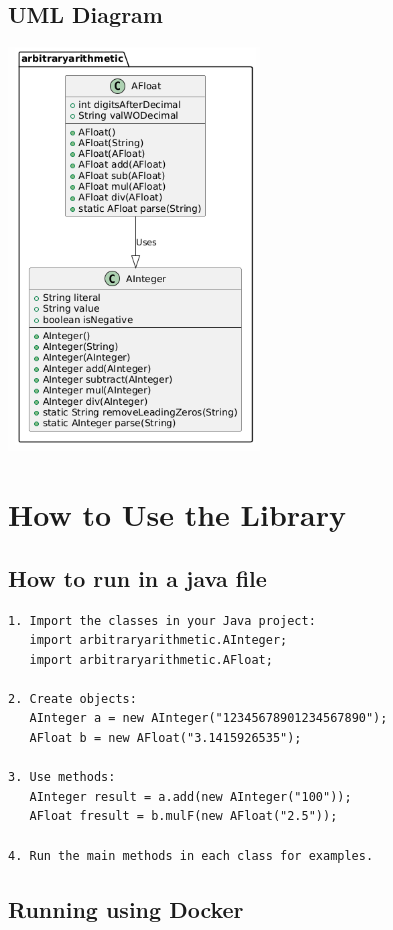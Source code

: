 \documentclass[12pt]{article}
\begin{document}
\subsection*{UML Diagram}
\begin{center}
\includegraphics[width=0.5\textwidth]{uml-diagram.png}
\end{center}

\section{How to Use the Library}
\subsection{How to run in a java file}
\begin{verbatim}
1. Import the classes in your Java project:
   import arbitraryarithmetic.AInteger;
   import arbitraryarithmetic.AFloat;

2. Create objects:
   AInteger a = new AInteger("12345678901234567890");
   AFloat b = new AFloat("3.1415926535");

3. Use methods:
   AInteger result = a.add(new AInteger("100"));
   AFloat fresult = b.mulF(new AFloat("2.5"));

4. Run the main methods in each class for examples.

\end{verbatim}
\subsection{Running using Docker}
\end{document}
